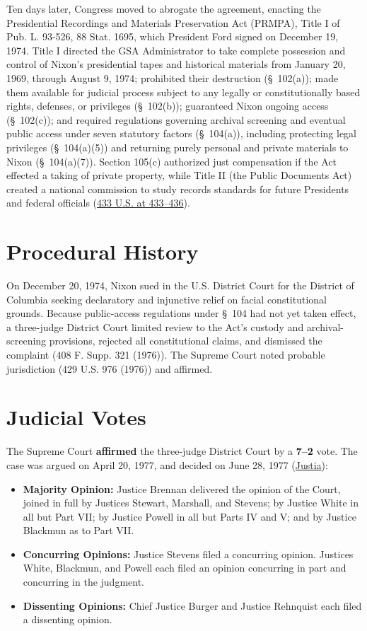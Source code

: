 \documentclass[12pt]{article}
\begin{document}
Ten days later, Congress moved to abrogate the agreement, enacting the Presidential Recordings and Materials Preservation Act (PRMPA), Title I of Pub. L. 93-526, 88 Stat. 1695, which President Ford signed on December 19, 1974. Title I directed the GSA Administrator to take complete possession and control of Nixon's presidential tapes and historical materials from January 20, 1969, through August 9, 1974; prohibited their destruction (\S~102(a)); made them available for judicial process subject to any legally or constitutionally based rights, defenses, or privileges (\S~102(b)); guaranteed Nixon ongoing access (\S~102(c)); and required regulations governing archival screening and eventual public access under seven statutory factors (\S~104(a)), including protecting legal privileges (\S~104(a)(5)) and returning purely personal and private materials to Nixon (\S~104(a)(7)). Section 105(c) authorized just compensation if the Act effected a taking of private property, while Title II (the Public Documents Act) created a national commission to study records standards for future Presidents and federal officials (\href{https://supreme.justia.com/cases/federal/us/433/425/}{433 U.S. at 433--436}).

\section{Procedural History}
On December 20, 1974, Nixon sued in the U.S. District Court for the District of Columbia seeking declaratory and injunctive relief on facial constitutional grounds. Because public-access regulations under \S~104 had not yet taken effect, a three-judge District Court limited review to the Act's custody and archival-screening provisions, rejected all constitutional claims, and dismissed the complaint (408 F. Supp. 321 (1976)). The Supreme Court noted probable jurisdiction (429 U.S. 976 (1976)) and affirmed.

\section{Judicial Votes}
The Supreme Court \textbf{affirmed} the three-judge District Court by a \textbf{7--2} vote. The case was argued on April 20, 1977, and decided on June 28, 1977 (\href{https://supreme.justia.com/cases/federal/us/433/425/}{Justia}):

\begin{itemize}
    \item \textbf{Majority Opinion:} Justice Brennan delivered the opinion of the Court, joined in full by Justices Stewart, Marshall, and Stevens; by Justice White in all but Part VII; by Justice Powell in all but Parts IV and V; and by Justice Blackmun as to Part VII.
    \item \textbf{Concurring Opinions:} Justice Stevens filed a concurring opinion. Justices White, Blackmun, and Powell each filed an opinion concurring in part and concurring in the judgment.
    \item \textbf{Dissenting Opinions:} Chief Justice Burger and Justice Rehnquist each filed a dissenting opinion.
\end{itemize}
\end{document}

